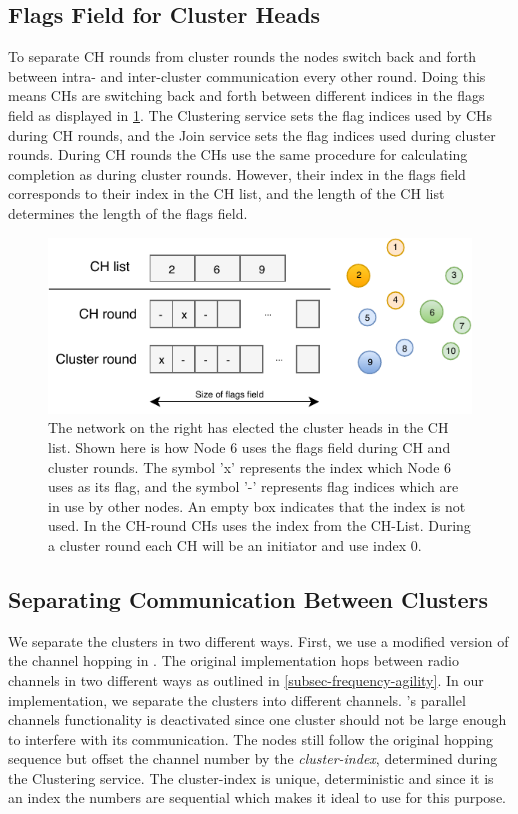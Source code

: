 \subsection{Flags Field for Cluster Heads}
To separate CH rounds from cluster rounds the nodes switch back and forth between intra- and inter-cluster communication every other round. Doing this means CHs are switching back and forth between different indices in the flags field as displayed in \cref{fig:flags-field-for-cluster-heads}. The Clustering service sets the flag indices used by CHs during CH rounds, and the Join service sets the flag indices used during cluster rounds. During CH rounds the CHs use the same procedure for calculating completion as during cluster rounds. However, their index in the flags field corresponds to their index in the CH list, and the length of the CH list determines the length of the flags field.

\begin{figure}[bt]
    \centering
    \includegraphics{figure/CH-changes-flag-index.pdf}
    \caption{
    The network on the right has elected the cluster heads in the CH list. Shown here is how Node 6 uses the flags field during CH and cluster rounds. The symbol 'x' represents the index which Node 6 uses as its flag, and the symbol '-' represents flag indices which are in use by other nodes. An empty box indicates that the index is not used. In the CH-round CHs uses the index from the CH-List. During a cluster round each CH will be an initiator and use index 0.}
    \label{fig:flags-field-for-cluster-heads}
\end{figure}

\subsection{Separating Communication Between Clusters}
\label{subsec:separating-the-clusters}
We separate the clusters in two different ways. First, we use a modified version of the channel hopping in \atwo{}. The original \atwo{} implementation hops between radio channels in two different ways as outlined in \cref{subsec-frequency-agility}. In our implementation, we separate the clusters into different channels. \atwo{}'s parallel channels functionality is deactivated since one cluster should not be large enough to interfere with its communication. The nodes still follow the original hopping sequence but offset the channel number by the \textit{cluster-index}, determined during the Clustering service. The cluster-index is unique, deterministic and since it is an index the numbers are sequential which makes it ideal to use for this purpose.

